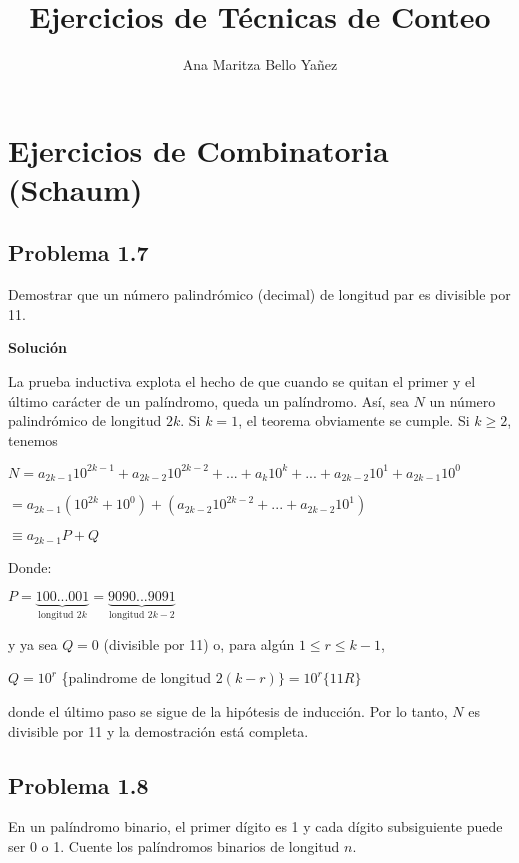 \documentclass[12pt]{article}
\begin{document}
\title{Ejercicios de Técnicas de Conteo}
\author{Ana Maritza Bello Ya\~nez}
\maketitle
\setlength{\parindent}{0pt}
\setlength{\parskip}{1em}

\section*{Ejercicios de Combinatoria (Schaum)}

\subsection*{Problema 1.7}
Demostrar que un número palindrómico (decimal) de longitud par es divisible por
11.

\textbf{Solución}

La prueba inductiva explota el hecho de que cuando se quitan el primer y el
último carácter de un palíndromo, queda un palíndromo. Así, sea $N$ un número
palindrómico de longitud $2k$. Si $k = 1$, el teorema obviamente se cumple. Si
$k \geq 2$, tenemos

$ N = a_{2k-1} 10^{2k-1} + a_{2k-2} 10^{2k-2} + ... + a_{k} 10^{k} + ... +
a_{2k-2} 10^{1} + a_{2k-1} 10^{0} $

$ = a_{2k-1}(10^{2k}+10^0) + (a_{2k-2}10^{2k-2}+...+ a_{2k-2}10^{1}) $

$ \equiv a_{2k-1} P + Q$

Donde:

$P = \underbrace{100...001}_{\text{longitud } 2k} =
\underbrace{9090...9091}_{\text{longitud } 2k-2}$

y ya sea $Q=0$ (divisible por 11) o, para algún $1 \leq r \leq k-1$,

$Q = 10^r$ \{palindrome de longitud $ 2(k-r)\} = 10^r\{11R\} $

donde el último paso se sigue de la hipótesis de inducción. Por lo tanto, $N$ es
divisible por 11 y la demostración está completa.

\subsection*{Problema 1.8}

En un palíndromo binario, el primer dígito es 1 y cada dígito subsiguiente puede
ser 0 o 1. Cuente los palíndromos binarios de longitud $n$.
\end{document}
